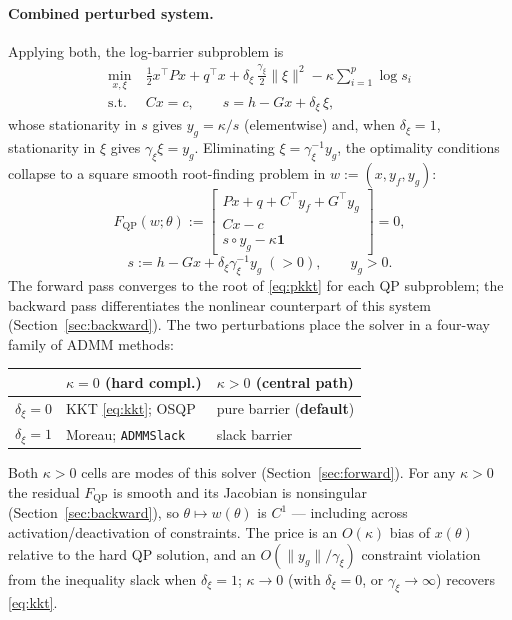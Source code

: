 \documentclass[10pt,twocolumn]{article}
\newcommand{\half}{\tfrac{1}{2}}
\newcommand{\ones}{\mathbf{1}}
\begin{document}
\paragraph{Combined perturbed system.} Applying both, the log-barrier subproblem is
\begin{equation}
\label{eq:barrier-sub}
\begin{aligned}
\min_{x,\xi}\ & \half x^\top Px + q^\top x
+ \delta_\xi\,\frac{\gamma_\xi}{2}\|\xi\|^2
 - \kappa\sum_{i=1}^{p}\log s_i\\
\text{s.t.}\ & Cx = c, \qquad s = h - Gx + \delta_\xi\,\xi ,
\end{aligned}
\end{equation}
whose stationarity in $s$ gives $y_g = \kappa/s$ (elementwise) and, when
$\delta_\xi = 1$, stationarity in $\xi$ gives $\gamma_\xi\xi = y_g$. Eliminating
$\xi = \gamma_\xi^{-1}y_g$, the optimality conditions collapse to a square smooth
root-finding problem in $w := (x, y_f, y_g)$:
\begin{equation}
\label{eq:pkkt}
F_{\mathrm{QP}}(w;\theta) :=
\begin{bmatrix}
Px + q + C^\top y_f + G^\top y_g\\[1pt]
Cx - c\\[1pt]
s \circ y_g - \kappa\ones
\end{bmatrix} = 0,
\end{equation}
\begin{equation}
\label{eq:sdef}
s := h - Gx + \delta_\xi\gamma_\xi^{-1}y_g \;(>0), \qquad y_g > 0 .
\end{equation}
The forward pass converges to the root of \eqref{eq:pkkt} for each QP subproblem;
the backward pass differentiates the nonlinear counterpart of this system
(Section~\ref{sec:backward}). The two perturbations place the solver in a four-way
family of ADMM methods:
\begin{center}
\small
\begin{tabular}{@{}lll@{}}
\toprule
& $\kappa = 0$ (hard compl.) & $\kappa > 0$ (central path)\\
\midrule
$\delta_\xi=0$ & KKT \eqref{eq:kkt}; OSQP~\cite{osqp} & pure barrier (\textbf{default})\\
$\delta_\xi=1$ & Moreau; \texttt{ADMMSlack}~\cite{turbompc} & slack barrier\\
\bottomrule
\end{tabular}
\end{center}
Both $\kappa > 0$ cells are modes of this solver (Section~\ref{sec:forward}).
For any $\kappa>0$ the residual $F_{\mathrm{QP}}$ is smooth and its Jacobian is
nonsingular (Section~\ref{sec:backward}), so $\theta\mapsto w(\theta)$ is $C^1$ ---
including across activation/deactivation of constraints. The price is an
$O(\kappa)$ bias of $x(\theta)$ relative to the hard QP solution, and an
$O(\|y_g\|/\gamma_\xi)$ constraint violation from the inequality slack when
$\delta_\xi = 1$; $\kappa\to 0$ (with $\delta_\xi = 0$, or $\gamma_\xi\to\infty$)
recovers \eqref{eq:kkt}.
\end{document}
